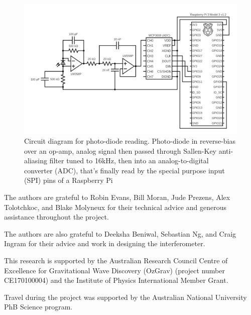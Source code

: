 \documentclass[prb,preprint]{revtex4-1}
\begin{document}
\begin{figure}%
	\includegraphics[width=\textwidth]{circuit_diagram.pdf}
	\caption{Circuit diagram for photo-diode reading. Photo-diode in reverse-bias over an op-amp, analog signal then passed through Sallen-Key anti-aliasing filter tuned to 16kHz, then into an analog-to-digital converter (ADC), that’s finally read by the special purpose input (SPI) pins of a Raspberry Pi}
	\label{fig:circuit_diagram}
\end{figure}



\begin{acknowledgments}
The authors are grateful to Robin Evans, Bill Moran, Jude Prezens, Alex Tolotchkoc, and Blake Molyneux for their technical advice and generous assistance throughout the project.
	
The authors are also grateful to Deeksha Beniwal, Sebastian Ng, and Craig Ingram for their advice and work in designing the interferometer. 

This research is supported by the Australian Research Council Centre of Excellence for Gravitational Wave Discovery (OzGrav) (project number CE170100004) and the Institute of Physics International Member Grant.

Travel during the project was supported by the Australian National University PhB Science  program.

\end{acknowledgments}




\end{document}
